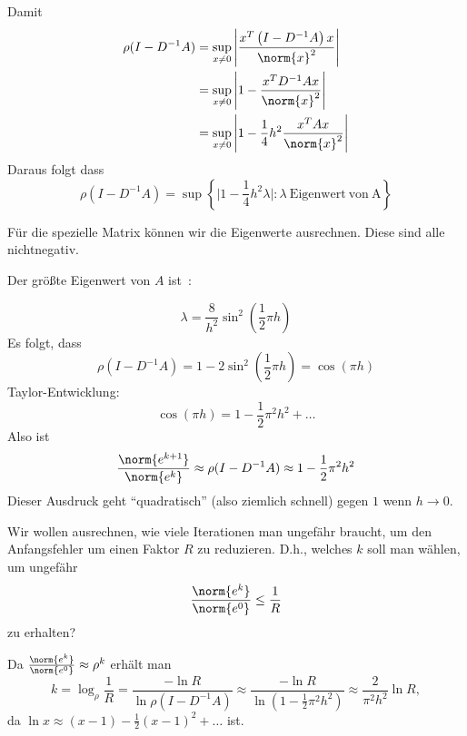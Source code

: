 Damit
\begin{align*}
    \rho (I-D^{-1}A)
    & = \sup_{x \neq 0} \left\vert \frac{x^T \left(I-D^{-1}A \right) x}{\norm{x}^2} \right\vert \\
    & = \sup_{x \neq 0} \left\vert 1-\frac{x^T D^{-1}Ax}{\norm{x}^2} \right\vert \\
    & = \sup_{x \neq 0} \left\vert 1-\frac{1}{4}h^2 \frac{x^TAx}{\norm{x}^2} \right\vert
\end{align*}
Daraus folgt dass
\begin{equation*}
 \rho (I-D^{-1}A ) =\sup \left\lbrace \Big\vert 1- \frac{1}{4} h^2 \lambda \Big\vert \colon \lambda\ \mathrm{Eigenwert\ von\ A} \right\rbrace
\end{equation*}

Für die spezielle Matrix können wir die Eigenwerte ausrechnen.  Diese sind
alle nichtnegativ.

Der größte Eigenwert von $A$ ist~\cite[Kapitel~12.3.3]{dahmen_reusken:2008}:

\begin{equation*}
 \lambda =\frac{8}{h^2} \sin^2 \left( \frac{1}{2} \pi h \right)
\end{equation*}
Es folgt, dass
\begin{equation*}
 \rho (I-D^{-1}A)=1-2 \sin^2 \left( \frac{1}{2} \pi h \right)=\cos (\pi h)
\end{equation*}
Taylor-Entwicklung:
\begin{equation*}
    \cos \left( \pi h \right)=1-\frac{1}{2} \pi^2 h^2+\ldots
\end{equation*}
Also ist
\begin{equation*}
 \frac{\norm{e^{k+1}}}{\norm{e^k}} \approx \rho (I-D^{-1}A) \approx 1-\frac{1}{2} \pi^2h^2
\end{equation*}
Dieser Ausdruck geht "`quadratisch"' (also ziemlich schnell) gegen $1$ wenn $h \to 0$.

\bigskip

Wir wollen ausrechnen, wie viele Iterationen man ungefähr braucht, um den Anfangsfehler
um einen Faktor $R$ zu reduzieren.  D.h., welches $k$ soll man wählen, um ungefähr
\begin{equation*}
 \frac{\norm{e^k}}{\norm{e^0}} \le \frac{1}{R}
\end{equation*}
zu erhalten?

Da $\frac{\norm{e^k}}{\norm{e^0}} \approx \rho^k$ erhält man
\begin{equation*}
 k
 =
 \log_\rho \frac{1}{R}
 =
 \frac{-\ln R}{\ln \rho \left(I-D^{-1}A \right)} \approx \frac{-\ln R}{\ln \left(1-\frac{1}{2}\pi^2 h^2 \right)} \approx \frac{2}{\pi^2 h^2} \ln R,
\end{equation*}
da $\ln x \approx (x-1)-\frac{1}{2} (x-1)^2 + \ldots$ ist.

